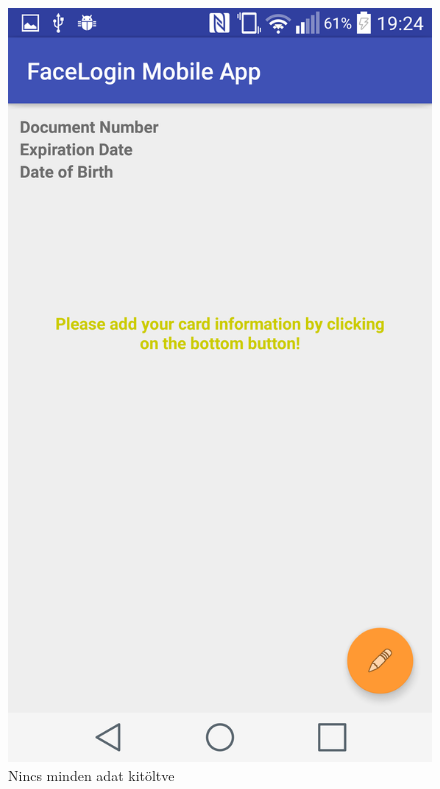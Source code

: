 \begin{figure}[h]
\begin{minipage}{.50\textwidth}
    \includegraphics[scale=0.10]{img/not_enough_mrtd_data}
    \caption{Nincs minden adat kitöltve}
 \end{minipage}


\end{figure}
